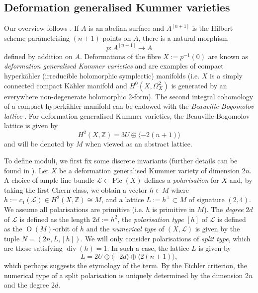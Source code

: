 \documentclass[12pt, a4paper]{article}
\newcommand{\ZZ}{\mathbb{Z}}
\newcommand{\la}{\langle}
\newcommand{\ra}{\rangle}
\newcommand{\lc}{\mathcal{L}}
\newcommand{\opn}{\operatorname}
\newcommand{\op}{\oplus}
\begin{document}
\subsection{Deformation generalised Kummer varieties}
Our overview follows \cite{Handbook}. 
If $A$ is an abelian surface and $A^{[n+1]}$ is the Hilbert scheme parametrising $(n+1)$-points on $A$, there is a natural morphism
\[
  p:A^{[n+1]} \rightarrow A
\]
defined by addition on $A$.
Deformations of the fibre $X:=p^{-1}(0)$ are known as \emph{deformation generalised Kummer varieties} and are examples of compact hyperk\"ahler (irreducible holomorphic symplectic) manifolds \cite{beauvillesexamples,huybrechtsbook} (i.e. $X$ is a simply connected compact K\"ahler manifold and $H^0(X, \Omega_X^2)$ is generated by an everywhere non-degenerate holomorphic 2-form).
The second integral cohomology of a compact hyperk\"ahler manifold can be endowed with the \emph{Beauville-Bogomolov lattice} \cite{beauvillesexamples, fujiki}.
For deformation generalised Kummer varieties, the Beauville-Bogomolov lattice is given by \cite{rapagnetta2}
\[
H^2(X, \ZZ) = 3 U \op \la -2(n+1) \ra
\]
and will be denoted by $M$ when viewed as an abstract lattice.

To define moduli, we first fix some discrete invariants (further details can be found in \cite{Handbook}).
Let $X$ be a deformation generalised Kummer variety of dimension $2n$.
A choice of ample line bundle $\lc \in \opn{Pic}(X)$ defines a \emph{polarisation} for $X$ and, by taking the first Chern class, we obtain a vector $h \in M$ where $h:=c_1( \lc) \in H^2(X, \ZZ) \cong M$, and a lattice $L := h^{\perp} \subset M$ of signature $(2,4)$.
We assume all polarisations are primitive (i.e. $h$ is primitive in $M$).
The \emph{degree} $2d$ of $\lc$ is defined as the length $2d:=h^2$,
the \emph{polarisation type} $[h]$ of $\lc$ is defined as the $\opn{O}(M)$-orbit of $h$ and 
 the \emph{numerical type} of $(X, \lc)$ is given by the tuple $N=(2n, L, [h])$.
We will only consider polarisations of \emph{split type}, which are those satisfying $\opn{div}(h)=1$.
In such a case,  the lattice $L$ is given by \cite[Corollary 4.0.3]{DawesThesis} 
\begin{equation}\label{ldef}
  L = 2U \op \la - 2d \ra \op \la 2(n+1) \ra,
\end{equation}
which perhaps suggests the etymology of the term.
By the Eichler criterion, the numerical type of a split polarisation is uniquely determined by the dimension $2n$ and the degree $2d$.
\end{document}
